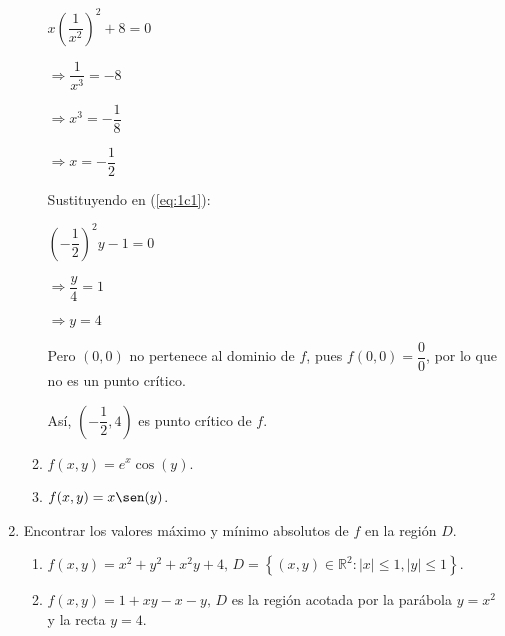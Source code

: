 \documentclass[fleqn, 12pt]{article}
\begin{document}
\begin{enumerate}
\begin{enumerate}
            $ x \left( \dfrac{1}{x^2} \right)^2 + 8 = 0 $

            $ \Longrightarrow \dfrac{1}{x^3} = -8 $

            $ \Longrightarrow x^3 = -\dfrac{1}{8} $

            $ \Longrightarrow x = -\dfrac{1}{2} $

            Sustituyendo en (\ref{eq:1c1}): 

            $ \left( -\dfrac{1}{2} \right)^2 y - 1 = 0 $

            $ \Longrightarrow \dfrac{y}{4} = 1 $

            $ \Longrightarrow y = 4 $

            Pero $ (0,0) $ no pertenece al dominio de $ f $, pues $ f(0,0) = \dfrac{0}{0} $, por lo que no es un punto crítico.

            Así, $ \left( -\dfrac{1}{2}, 4 \right) $ es punto crítico de $ f $.

            \item $ f(x,y) = e^x \cos (y) $.
            

            \item $ f(x,y) = x \sen (y) $.
            
        \end{enumerate}

        \item Encontrar los valores máximo y mínimo absolutos de $ f $ en la región $ D $.
        
        \begin{enumerate}
            \item $ f(x,y) = x^2 + y^2 + x^2 y + 4, \, D = \left\lbrace (x,y) \in \mathbb{R}^2 : \lvert x \rvert \leq 1, \lvert y \rvert \leq 1 \right\rbrace $.
            

            \item $ f(x,y) = 1 + xy - x - y, \, D $ es la región acotada por la parábola $ y = x^2 $ y la recta $ y = 4 $.
            


\end{enumerate}
\end{enumerate}
\end{document}
